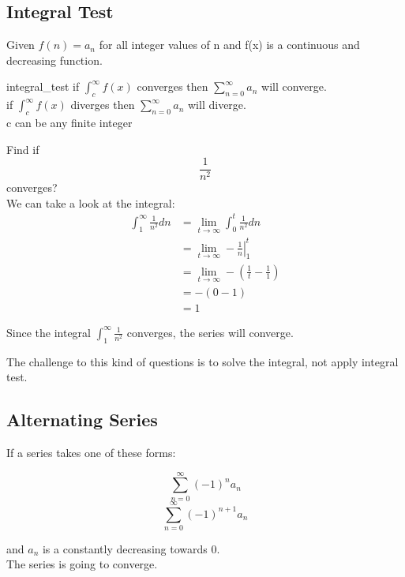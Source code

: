 	\subsection{Integral Test}
	Given $f(n)=a_n$ for all integer values of n and f(x) is a continuous and decreasing function.
	\begin{theorem}{}{integral_test}
    	if $\displaystyle\int^\infty_cf(x)$ converges then $\displaystyle\sum^{\infty}_{n=0}a_n$ will converge.\\
    	if $\displaystyle\int^\infty_cf(x)$ diverges then $\displaystyle\sum^{\infty}_{n=0}a_n$ will diverge.\\
    	c can be any finite integer
	\end{theorem}
	
	\begin{simple}{}{}
	Find if
	$$\frac{1}{n^2}$$
	converges?\\
	
	We can take a look at the integral:
	\begin{align*}
	    \int^\infty_1\frac{1}{n^2}dn&=\lim_{t\to\infty}\int^t_0\frac{1}{n^2}dn\\
	    &=\lim_{t\to\infty}-\left.\frac{1}{n}\right|^t_1\\
	    &=\lim_{t\to\infty}-\left(\frac{1}{t}-\frac{1}{1}\right)\\
	    &=-\left(0-1\right)\\
	    &=1
	\end{align*}
	
	Since the integral $\displaystyle\int^\infty_1\frac{1}{n^2}$ converges, the series will converge.
	\end{simple}
	
	The challenge to this kind of questions is to solve the integral, not apply integral test.
	
	\subsection{Alternating Series}
	\begin{theorem}{}{}
	    If a series takes one of these forms:
	    \begin{multicols}{2}
	    \noindent\begin{equation}
	        \sum^\infty_{n=0}(-1)^n a_n
	    \end{equation}
	    \begin{equation}
	        \sum^\infty_{n=0}(-1)^{n+1}a_n
	    \end{equation}
	    \end{multicols}
	    
	    and $a_n$ is a constantly decreasing towards 0. \\
	    The series is going to converge.
	\end{theorem}
	
